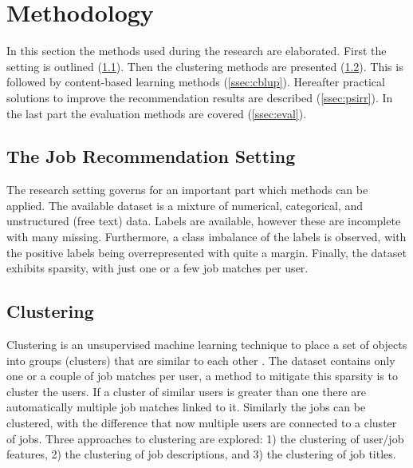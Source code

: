 \section{Methodology}
\label{sec:meth}

In this section the methods used during the research are elaborated. First the setting is outlined (\ref{ssec:jrs}). Then the clustering methods are presented (\ref{ssec:clus}). This is followed by content-based learning methods (\ref{ssec:cblup}). Hereafter practical solutions to improve the recommendation results are described (\ref{ssec:psirr}). In the last part the evaluation methods are covered (\ref{ssec:eval}). 

\subsection{The Job Recommendation Setting}
\label{ssec:jrs}
The research setting governs for an important part which methods can be applied. 
The available dataset is a mixture of numerical, categorical, and unstructured (free text) data. 
Labels are available, however these are incomplete with many missing.
Furthermore, a class imbalance of the labels is observed, with the positive labels being overrepresented with quite a margin. 
Finally, the dataset exhibits sparsity, with just one or a few job matches per user.


\subsection{Clustering}
\label{ssec:clus}
Clustering is an unsupervised machine learning technique to place a set of objects into groups (clusters) that are similar to each other \cite{hartigan1979algorithm}.
The dataset contains only one or a couple of job matches per user, a method to mitigate this sparsity is to cluster the users. 
If a cluster of similar users is greater than one there are automatically multiple job matches linked to it. 
Similarly the jobs can be clustered, with the difference that now multiple users are connected to a cluster of jobs. 
Three approaches to clustering are explored: 1) the clustering of user/job features, 2) the clustering of job descriptions, and 3) the clustering of job titles. 

